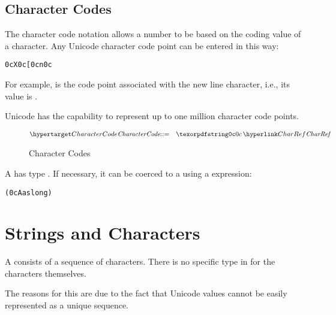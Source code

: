 \subsection{Character Codes}
The character code notation allows a number to be based on the coding value of a character. Any Unicode character code point can be entered in this way:
\begin{alltt}
0cX 0c[ 0c\bsl{}n 0c
\end{alltt}
For example,  is the code point associated with the new line character, i.e., its value is .
\begin{aside}
Unicode has the capability to represent up to one million character code points.
\end{aside}

\begin{figure}[htbp]
\label{characterCodeFig}
\begin{eqnarray*}
\ntDef{CharacterCode}&\arrow&\q{0c}\,\ntRef{CharRef}
\end{eqnarray*}
\caption{Character Codes}
\vspace{-2ex}
\end{figure}

A  has type . If necessary, it can be coerced to a  using a  expression:
\begin{alltt}
(0cA as long)
\end{alltt}

\section{Strings and Characters}
\label{string}

A  consists of a sequence of characters. There is no specific type in \Sr for the characters themselves.

\begin{aside}
The reasons for this are due to the fact that Unicode  values cannot be easily represented as a unique sequence.
\end{aside}


